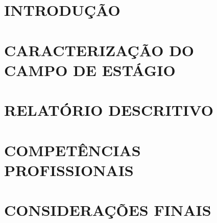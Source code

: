 \documentclass[12pt,a4paper]{article}
\begin{document}
\newpage


\tableofcontents
\newpage
\section{INTRODUÇÃO}


\section{CARACTERIZAÇÃO DO CAMPO DE ESTÁGIO}


\section{RELATÓRIO DESCRITIVO}


\section{COMPETÊNCIAS PROFISSIONAIS}


\section{CONSIDERAÇÕES FINAIS}


\end{document}
